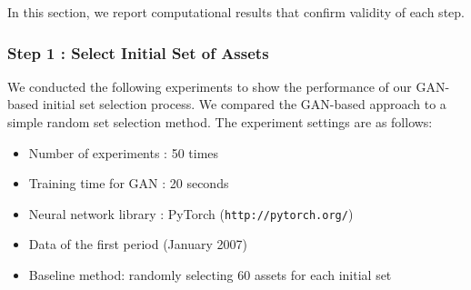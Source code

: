 \documentclass[11pt]{article}
\begin{document}
In this section, we report computational results that confirm validity of each step. 
	
	


\subsubsection{Step 1 : Select Initial Set of Assets }
	
We conducted the following experiments to show the performance of our GAN-based initial set selection process. We compared the GAN-based approach to a simple random set selection method. The experiment settings are as follows:
\begin{itemize}
	\item Number of experiments : 50 times
	\item Training time for GAN : 20 seconds
	\item Neural network library : PyTorch (\texttt{http://pytorch.org/})
	\item Data of the first period (January 2007)
	\item Baseline method: randomly selecting 60 assets for each initial set
\end{itemize}
\end{document}
